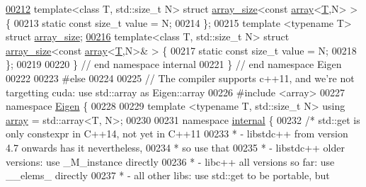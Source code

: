 \begin{DoxyCode}
\hyperlink{struct_eigen_1_1internal_1_1array__size_3_01const_01array_3_01_t_00_01_n_01_4_01_4}{00212} \textcolor{keyword}{template}<\textcolor{keyword}{class} T, std::\textcolor{keywordtype}{size\_t} N> \textcolor{keyword}{struct }\hyperlink{struct_eigen_1_1internal_1_1array__size}{array\_size}<const \hyperlink{class_eigen_1_1array}{array}<\hyperlink{group___sparse_core___module}{T},N> > \{
00213   \textcolor{keyword}{static} \textcolor{keyword}{const} \textcolor{keywordtype}{size\_t} value = N;
00214 \};
00215 \textcolor{keyword}{template} <\textcolor{keyword}{typename} T> \textcolor{keyword}{struct }\hyperlink{struct_eigen_1_1internal_1_1array__size}{array\_size};
\hyperlink{struct_eigen_1_1internal_1_1array__size_3_01const_01array_3_01_t_00_01_n_01_4_01_6_4}{00216} \textcolor{keyword}{template}<\textcolor{keyword}{class} T, std::\textcolor{keywordtype}{size\_t} N> \textcolor{keyword}{struct }\hyperlink{struct_eigen_1_1internal_1_1array__size}{array\_size}<const \hyperlink{class_eigen_1_1array}{array}<\hyperlink{group___sparse_core___module}{T},N>& > \{
00217   \textcolor{keyword}{static} \textcolor{keyword}{const} \textcolor{keywordtype}{size\_t} value = N;
00218 \};
00219 
00220 \}  \textcolor{comment}{// end namespace internal}
00221 \}  \textcolor{comment}{// end namespace Eigen}
00222 
00223 \textcolor{preprocessor}{#else}
00224 
00225 \textcolor{comment}{// The compiler supports c++11, and we're not targetting cuda: use std::array as Eigen::array}
00226 \textcolor{preprocessor}{#include <array>}
00227 \textcolor{keyword}{namespace }\hyperlink{namespace_eigen}{Eigen} \{
00228 
00229 \textcolor{keyword}{template} <\textcolor{keyword}{typename} T, std::\textcolor{keywordtype}{size\_t} N> \textcolor{keyword}{using} \hyperlink{class_eigen_1_1array}{array} = std::array<T, N>;
00230 
00231 \textcolor{keyword}{namespace }\hyperlink{namespaceinternal}{internal} \{
00232 \textcolor{comment}{/* std::get is only constexpr in C++14, not yet in C++11}
00233 \textcolor{comment}{ *     - libstdc++ from version 4.7 onwards has it nevertheless,}
00234 \textcolor{comment}{ *                                          so use that}
00235 \textcolor{comment}{ *     - libstdc++ older versions: use \_M\_instance directly}
00236 \textcolor{comment}{ *     - libc++ all versions so far: use \_\_elems\_ directly}
00237 \textcolor{comment}{ *     - all other libs: use std::get to be portable, but}

\end{DoxyCode}
